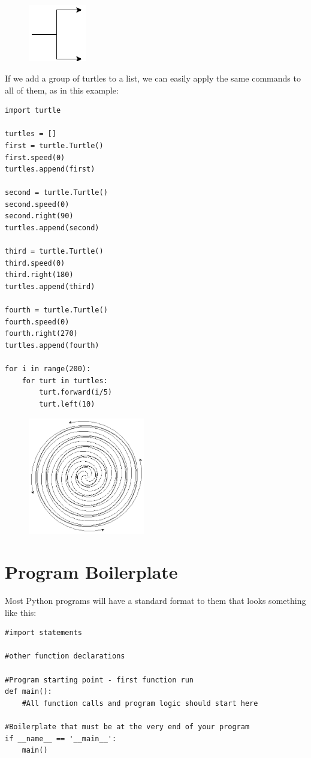 \documentclass[11pt]{cselabheader}
\begin{document}
\begin{figure}[h]
  \centering
  \includegraphics[width=1.0in]{img/turtle_prong}
\end{figure}

If we add a group of turtles to a list, we can easily apply the same commands to all of them, as in this example:

\begin{lstlisting}[style=python]
import turtle

turtles = []
first = turtle.Turtle()
first.speed(0)
turtles.append(first)

second = turtle.Turtle()
second.speed(0)
second.right(90)
turtles.append(second)

third = turtle.Turtle()
third.speed(0)
third.right(180)
turtles.append(third)

fourth = turtle.Turtle()
fourth.speed(0)
fourth.right(270)
turtles.append(fourth)

for i in range(200):
    for turt in turtles:
        turt.forward(i/5)
        turt.left(10)
\end{lstlisting}

\begin{figure}[h]
  \centering
  \includegraphics[width=2.0in]{img/fancy_spiral}
\end{figure}

\section{Program Boilerplate}
\label{sec:boil}

Most Python programs will have a standard format to them that looks something like this:

\begin{lstlisting}[style=python]
#import statements

#other function declarations

#Program starting point - first function run
def main():
    #All function calls and program logic should start here

#Boilerplate that must be at the very end of your program
if __name__ == '__main__':
    main()
\end{lstlisting}
\end{document}
